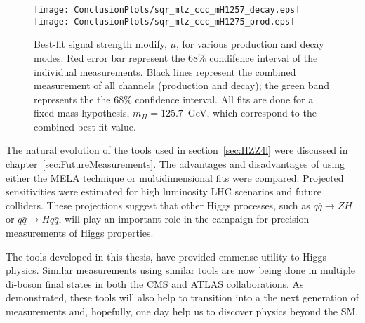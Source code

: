 \begin{figure}
\begin{center}
\texttt{[image: ConclusionPlots/sqr\_mlz\_ccc\_mH1257\_decay.eps]}
\texttt{[image: ConclusionPlots/sqr\_mlz\_ccc\_mH1275\_prod.eps]}
\caption{Best-fit signal strength modify, $\mu$, for various 
production and decay modes.  Red error bar represent the 68\%
condifence interval of the individual measurements.  Black lines
represent the combined measurement of all channels (production and
decay); the green band represents the the 68\% confidence interval.
All fits are done for a fixed mass hypothesis, $m_H=125.7$~GeV, 
which correspond to the combined best-fit value.}
\label{fig:crossSectionsByChannel}
\end{center}
\end{figure}

The natural evolution of the tools used in 
section~\ref{sec:HZZ4l} were discussed in 
chapter~\ref{sec:FutureMeasurements}.  
The advantages and disadvantages of using either the MELA 
technique or multidimensional fits were compared.  Projected
sensitivities were estimated for high luminosity LHC scenarios
and future colliders.  These projections suggest that
other Higgs processes, such as 
$q\bar{q}\to ZH$ or $q\bar{q}\to Hq\bar{q}$, will play 
an important role in the campaign for precision measurements
of Higgs properties.  
  
The tools developed in this thesis, have provided emmense utility
to Higgs physics.  
Similar measurements using similar tools
are now being done in multiple di-boson final states in both 
the CMS and ATLAS collaborations.  As demonstrated, these 
tools will also help to transition into a the next generation
of measurements and, hopefully, one day help us to discover
physics beyond the SM.  




